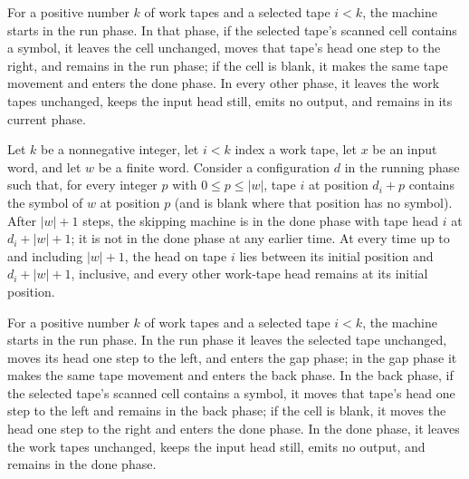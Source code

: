 \begin{definition}
\label{Turing.skipTM}
\leanok
{}
For a positive number $k$ of work tapes and a selected tape $i<k$, the machine starts in
the run phase. In that phase, if the selected tape's scanned cell contains a symbol, it
leaves the cell unchanged, moves that tape's head one step to the right, and remains in
the run phase; if the cell is blank, it makes the same tape movement and enters the done
phase. In every other phase, it leaves the work tapes unchanged, keeps the input head
still, emits no output, and remains in its current phase.
\end{definition}

\begin{theorem}
\label{Turing.skipTM_run_ofCfg}
\leanok
{}
Let $k$ be a nonnegative integer, let $i<k$ index a work tape, let $x$ be an input word,
and let $w$ be a finite word. Consider a configuration $d$ in the running phase such
that, for every integer $p$ with $0\le p\le |w|$, tape $i$ at position $d_i+p$ contains
the symbol of $w$ at position $p$ (and is blank where that position has no symbol).
After $|w|+1$ steps, the skipping machine is in the done phase with tape head $i$ at
$d_i+|w|+1$; it is not in the done phase at any earlier time. At every time up to and
including $|w|+1$, the head on tape $i$ lies between its initial position and
$d_i+|w|+1$, inclusive, and every other work-tape head remains at its initial position.
\end{theorem}

\begin{definition}
\label{Turing.skipBackTM}
\leanok
{}
For a positive number $k$ of work tapes and a selected tape $i<k$, the machine starts in
the run phase. In the run phase it leaves the selected tape unchanged, moves its head
one step to the left, and enters the gap phase; in the gap phase it makes the same tape
movement and enters the back phase. In the back phase, if the selected tape's scanned
cell contains a symbol, it moves that tape's head one step to the left and remains in
the back phase; if the cell is blank, it moves the head one step to the right and enters
the done phase. In the done phase, it leaves the work tapes unchanged, keeps the input
head still, emits no output, and remains in the done phase.
\end{definition}

